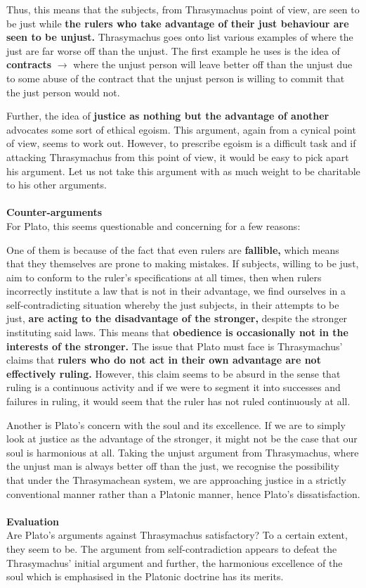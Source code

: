 \documentclass[12pt, letterpaper]{article}
\begin{document}
Thus, this means that the subjects, from Thrasymachus point of view, are seen to be just while \textbf{the rulers who take advantage of their just behaviour are seen to be unjust.} Thrasymachus goes onto list various examples of where the just are far worse off than the unjust. The first example he uses is the idea of \textbf{contracts} $\rightarrow$ where the unjust person will leave better off than the unjust due to some abuse of the contract that the unjust person is willing to commit that the just person would not.

Further, the idea of \textbf{justice as nothing but the advantage of another} advocates some sort of ethical egoism. This argument, again from a cynical point of view, seems to work out. However, to prescribe egoism is a difficult task and if attacking Thrasymachus from this point of view, it would be easy to pick apart his argument. Let us not take this argument with as much weight to be charitable to his other arguments. \\\\
\textbf{Counter-arguments}\\
For Plato, this seems questionable and concerning for a few reasons:

One of them is because of the fact that even rulers are \textbf{fallible,} which means that they themselves are prone to making mistakes. If subjects, willing to be just, aim to conform to the ruler's specifications at all times, then when rulers incorrectly institute a law that is not in their advantage, we find ourselves in a self-contradicting situation whereby the just subjects, in their attempts to be just, \textbf{are acting to the disadvantage of the stronger,} despite the stronger instituting said laws. This means that \textbf{obedience is occasionally not in the interests of the stronger.} The issue that Plato must face is Thrasymachus' claims that \textbf{rulers who do not act in their own advantage are not effectively ruling.} However, this claim seems to be absurd in the sense that ruling is a continuous activity and if we were to segment it into successes and failures in ruling, it would seem that the ruler has not ruled continuously at all.

Another is Plato's concern with the soul and its excellence. If we are to simply look at justice as the advantage of the stronger, it might not be the case that our soul is harmonious at all. Taking the unjust argument from Thrasymachus, where the unjust man is always better off than the just, we recognise the possibility that under the Thrasymachean system, we are approaching justice in a strictly conventional manner rather than a Platonic manner, hence Plato's dissatisfaction.  \\\\
\textbf{Evaluation}\\
Are Plato's arguments against Thrasymachus satisfactory? To a certain extent, they seem to be. The argument from self-contradiction appears to defeat the Thrasymachus' initial argument and further, the harmonious excellence of the soul which is emphasised in the Platonic doctrine has its merits.
\end{document}
